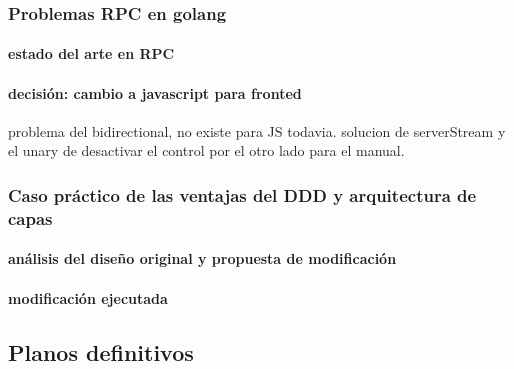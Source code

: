     \subsubsection{Problemas RPC en golang}\label{subsec:problemas-rpc-en-golang}
        \paragraph{estado del arte en RPC}
        \paragraph{decisión: cambio a javascript para fronted}
            problema del bidirectional, no existe para JS todavia. solucion de serverStream y el unary de desactivar el control por el otro lado para el manual.
    \subsubsection{Caso práctico de las ventajas del DDD y arquitectura de capas}
        \paragraph{análisis del diseño original y propuesta de modificación}
        \paragraph{modificación ejecutada}

\subsection{Planos definitivos}\label{subsec:planos definitivos}

